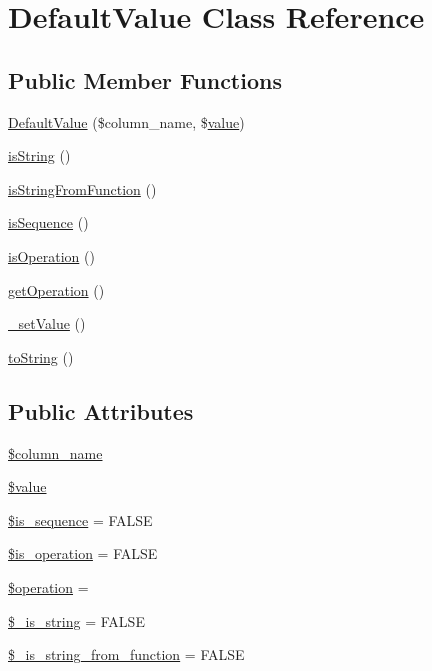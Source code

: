 \hypertarget{classDefaultValue}{}\section{Default\+Value Class Reference}
\label{classDefaultValue}
\subsection*{Public Member Functions}
\begin{DoxyCompactItemize}
\item 
\hyperlink{classDefaultValue_a738994d0f9563b86310d85ede30c2fc7}{Default\+Value} (\$column\+\_\+name, \$\hyperlink{common_2js_2jquery_8js_abe5393d870043cf6aaa1d5ad5fce755c}{value})
\item 
\hyperlink{classDefaultValue_a2ff17e887cf955aea26fbb1b3e11f491}{is\+String} ()
\item 
\hyperlink{classDefaultValue_aeef8c65be1e3cfe7459916653d6d9181}{is\+String\+From\+Function} ()
\item 
\hyperlink{classDefaultValue_a5186ba40cadb8a1740edd64665f4c126}{is\+Sequence} ()
\item 
\hyperlink{classDefaultValue_af7a051370a3b8bb17d9f9cf64a03be74}{is\+Operation} ()
\item 
\hyperlink{classDefaultValue_a1e607abe2e29a00fa3ab0cecba406776}{get\+Operation} ()
\item 
\hyperlink{classDefaultValue_a1a0d50d43f32dbb3df7e11467c6938be}{\+\_\+set\+Value} ()
\item 
\hyperlink{classDefaultValue_a0f0d4d1cc64b3bfb8d2acec2b113be4d}{to\+String} ()
\end{DoxyCompactItemize}
\subsection*{Public Attributes}
\begin{DoxyCompactItemize}
\item 
\hyperlink{classDefaultValue_a671e32e797e9975b6497a56a5ba92dc6}{\$column\+\_\+name}
\item 
\hyperlink{classDefaultValue_a963ea764e6dfb5dbfe87c4b8ffd131ac}{\$value}
\item 
\hyperlink{classDefaultValue_a7ad2c3e04c79053b6299c0fa0e35389e}{\$is\+\_\+sequence} = F\+A\+L\+SE
\item 
\hyperlink{classDefaultValue_ae01855465814b8be26de7bd0b33b6778}{\$is\+\_\+operation} = F\+A\+L\+SE
\item 
\hyperlink{classDefaultValue_a0b0e52103637bbb5ea0fdedcb0672fcd}{\$operation} = \textquotesingle{}\textquotesingle{}
\item 
\hyperlink{classDefaultValue_ac3b23483d015be5b48517fb96890b64a}{\$\+\_\+is\+\_\+string} = F\+A\+L\+SE
\item 
\hyperlink{classDefaultValue_a000cf284b962d5c3354abd73b611c888}{\$\+\_\+is\+\_\+string\+\_\+from\+\_\+function} = F\+A\+L\+SE
\end{DoxyCompactItemize}


